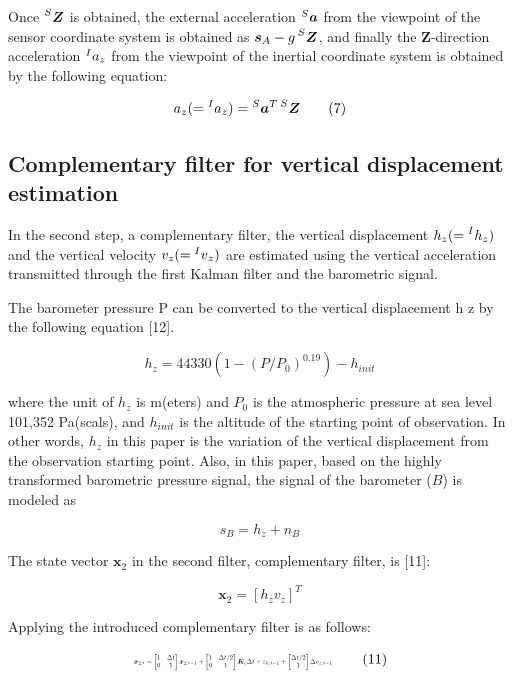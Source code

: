 \documentclass[10pt,journal,compsoc]{IEEEtran}
\begin{document}
Once $\prescript{S}{}{\bm{Z}}$ is obtained, the external acceleration
$\prescript{S}{}{\bm{a}}$ from the viewpoint of the sensor coordinate system is
obtained as  $\bm{s}_A-g\prescript{S}{}{\bm{Z}}$, and finally the $\bm{Z}$-direction
acceleration $\prescript{I}{}{a}_z$ from the viewpoint of the inertial coordinate system is
obtained by the following equation:

\[a_z(=\prescript{I}{}{a}_z)= \prescript{S}{}{\bm{a}}^T \prescript{S}{}{\bm{Z}}\tag{7}\]


\subsection{Complementary filter for vertical displacement estimation}

In the second step, a complementary filter, the vertical displacement 
$h_z (= \prescript{I}{}{h}_z)$ and the vertical velocity $v_z (= \prescript{I}{}{v}_z)$ 
are estimated using the vertical acceleration transmitted through the first Kalman filter and the barometric
signal.

The barometer pressure P can be converted to the vertical displacement h z by
the following equation [12].

\[h_z = 44330(1-(P/P_0)^{0.19})-h_{init}\tag{8}\]

\noindent where the unit of $h_z$ is m(eters) and $P_0$ is the atmospheric pressure at sea level
101,352 Pa(scals), and $h_{init}$ is the altitude of the starting point of
observation. In other words, $h_z$ in this paper is the variation of the vertical
displacement from the observation starting point.  Also, in this paper, based
on the highly transformed barometric pressure signal, the signal of the
barometer ($B$) is modeled as

\[s_B = h_z + n_B\tag{9}\]

The state vector $\bm{x}_2$ in the second filter, complementary filter, is [11]:

\[\bm{x}_2 = [h_z v_z]^T\tag{10}\]

Applying the introduced complementary filter is as follows:

\begin{equation}
\resizebox{.42 \textwidth}{!} 
{
$ 
\bm{x}_{2,t} = 
\begin{bmatrix} 1 & \Delta t \\ 0 & 1 \end{bmatrix} \bm{x}_{2,t-1} +
\begin{bmatrix} 1 & \Delta t / 2 \\ 0 & 1 \end{bmatrix} \bm{K}_c\Delta t \times \varepsilon_{h,t-1} +
\begin{bmatrix} \Delta t / 2 \\ 1 \end{bmatrix} \Delta v_{z,t-1}
$
}
\tag{11}
\end{equation}
\end{document}
